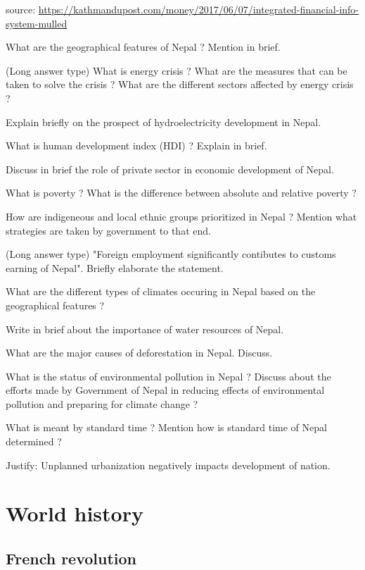 \documentclass[
  openany]{book}
\newcommand{\question}{\item}
\begin{document}
\begin{questions}
source: \url{https://kathmandupost.com/money/2017/06/07/integrated-financial-info-system-mulled}

\question What are the geographical features of Nepal ? Mention in brief.


\question (Long answer type) What is energy crisis ? What are the measures that can be taken to solve the crisis ? What are the different sectors affected by energy crisis ?

\question Explain briefly on the prospect of hydroelectricity development in Nepal.

\question What is human development index (HDI) ? Explain in brief.

\question Discuss in brief the role of private sector in economic development of Nepal. 

\question What is poverty ? What is the difference between absolute and relative poverty ?

\question How are indigeneous and local ethnic groups prioritized in Nepal ? Mention what strategies are taken by government to that end.

\question (Long answer type) "Foreign employment significantly contibutes to customs earning of Nepal". Briefly elaborate the statement.

\question What are the different types of climates occuring in Nepal based on the geographical features ?

\question Write in brief about the importance of water resources of Nepal.

\question What are the major causes of deforestation in Nepal. Discuss.

\question What is the status of environmental pollution in Nepal ? Discuss about the efforts made by Government of Nepal in reducing effects of environmental pollution and preparing for climate change ?

\question What is meant by standard time ? Mention how is standard time of Nepal determined ?

\question Justify: Unplanned urbanization negatively impacts development of nation.

\end{questions}

\hypertarget{world-history}{%
\chapter{World history}\label{world-history}}

\hypertarget{french-revolution}{%
\section{French revolution}\label{french-revolution}}
\end{document}
